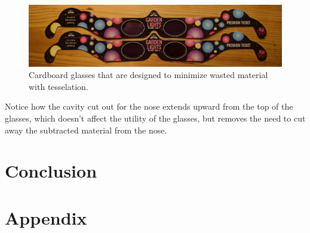 \documentclass[12pt,letterpaper]{article}
\begin{document}
\begin{figure}[H]
	\begin{center}
		\caption{Cardboard glasses that are designed to minimize wasted material with tesselation.}
		\label{fig:glasses}
		\includegraphics[width=.8\linewidth]{glasses}
	\end{center}
\end{figure}

Notice how the cavity cut out for the nose extends upward from the top of the glasses, which doesn't affect the utility of the glasses, but removes the need to cut away the subtracted material from the nose. 

\section{Conclusion}

\newpage


\newpage
\section{Appendix}
\listoffigures
\end{document}
